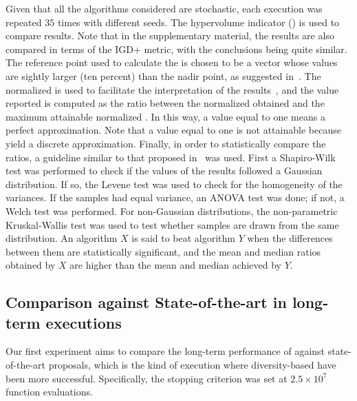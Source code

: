 Given that all the algorithms considered are stochastic, each execution was repeated $35$ times with different seeds.
%
The hypervolume indicator (\HV{}) is used to compare results.
%
Note that in the supplementary material, the results are also compared in terms of the IGD+ metric, with the conclusions being quite similar.
%
The reference point used to calculate the \HV{} is chosen to be a vector whose values are sightly larger (ten percent) than the nadir point, 
as suggested in~\cite{ishibuchi2017reference}.
%
The normalized \HV{} is used to facilitate the interpretation of the results~\cite{li2015evolutionary},
and the value reported is computed as the ratio between the normalized \HV{} obtained and the maximum attainable 
normalized \HV{}.
%
In this way, a value equal to one means a perfect approximation.
%
Note that a value equal to one is not attainable because \MOEAS{} yield a discrete approximation.
%
Finally, in order to statistically compare the \HV{} ratios, a guideline similar to that proposed in~\cite{Joel:StatisticalTest} was used. 
%
First a Shapiro-Wilk test was performed to check if the values of the results followed a Gaussian distribution. 
%
If so, the Levene test was used to check for the homogeneity of the variances. 
%
If the samples had equal variance, an ANOVA test was done; if not, a Welch test was performed. 
%
For non-Gaussian distributions, the non-parametric Kruskal-Wallis test was used to test whether samples are drawn from the same distribution. 
%
An algorithm $X$ is said to beat algorithm $Y$ when the differences between them are statistically significant, and the mean and median \HV{} ratios 
obtained by $X$ are higher than the mean and median achieved by $Y$.

%

\subsection{Comparison against State-of-the-art \MOEAS{} in long-term executions}

Our first experiment aims to compare the long-term performance of \VSDMOEA{} against state-of-the-art proposals, which
is the kind of execution where diversity-based \EAS{} have been more successful.
%
Specifically, the stopping criterion was set at $2.5 \times 10^7$ function evaluations.
%

